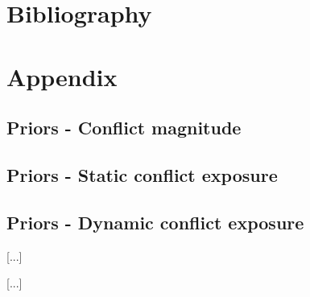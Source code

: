 \documentclass[a4paper]{article}
\begin{document}




\pagebreak

\section{Bibliography}
 


\section{Appendix}

\subsection{Priors - Conflict magnitude}\label{cmPrior}

\subsection{Priors - Static conflict exposure}\label{scePrior}

\subsection{Priors - Dynamic conflict exposure}\label{dcePrior}


[...]


[...]
\end{document}
